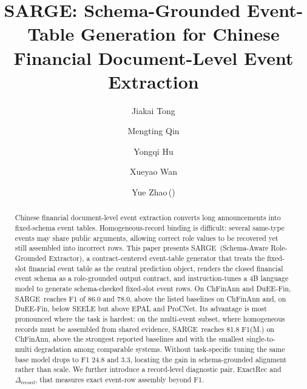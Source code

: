 \documentclass[runningheads]{llncs}
\newcommand{\method}{SARGE}
\begin{document}
\title{\method: Schema-Grounded Event-Table Generation for Chinese Financial Document-Level Event Extraction}
\titlerunning{\method: Schema-Grounded Event-Table Generation}

\author{Jiakai Tong \and
Mengting Qin \and
Yongqi Hu \and
Xueyao Wan \and
Yue Zhao\,(\Letter)}

\maketitle

\begin{abstract}
Chinese financial document-level event extraction converts long announcements into fixed-schema event tables. Homogeneous-record binding is difficult: several same-type events may share public arguments, allowing correct role values to be recovered yet still assembled into incorrect rows. This paper presents \method\ (Schema-Aware Role-Grounded Extractor), a contract-centered event-table generator that treats the fixed-slot financial event table as the central prediction object, renders the closed financial event schema as a role-grounded output contract, and instruction-tunes a 4B language model to generate schema-checked fixed-slot event rows. On ChFinAnn and DuEE-Fin, \method\ reaches F1 of 86.0 and 78.0, above the listed baselines on ChFinAnn and, on DuEE-Fin, below SEELE but above EPAL and ProCNet. Its advantage is most pronounced where the task is hardest: on the multi-event subset, where homogeneous records must be assembled from shared evidence, \method\ reaches 81.8 F1(M.) on ChFinAnn, above the strongest reported baselines and with the smallest single-to-multi degradation among comparable systems. Without task-specific tuning the same base model drops to F1 24.8 and 3.3, locating the gain in schema-grounded alignment rather than scale. We further introduce a record-level diagnostic pair, ExactRec and $\Delta_{\mathrm{record}}$, that measures exact event-row assembly beyond F1.
\end{abstract}
\end{document}
